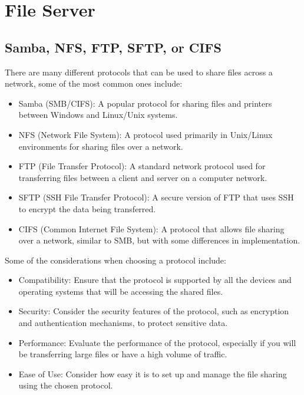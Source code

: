 \chapter{File Server}
\label{chp:fileserver}

\section{Samba, NFS, FTP, SFTP, or CIFS}
\label{sec:fileserver:protocols}
There are many different protocols that can be used to share files across a network, some of the most common ones include:

\begin{itemize}
    \item Samba (SMB/CIFS): A popular protocol for sharing files and printers between Windows and Linux/Unix systems.
    \item NFS (Network File System): A protocol used primarily in Unix/Linux environments for sharing files over a network.
    \item FTP (File Transfer Protocol): A standard network protocol used for transferring files between a client and server on a computer network.
    \item SFTP (SSH File Transfer Protocol): A secure version of FTP that uses SSH to encrypt the data being transferred.
    \item CIFS (Common Internet File System): A protocol that allows file sharing over a network, similar to SMB, but with some differences in implementation.
\end{itemize}

Some of the considerations when choosing a protocol include:

\begin{itemize}
    \item Compatibility: Ensure that the protocol is supported by all the devices and operating systems that will be accessing the shared files.
    \item Security: Consider the security features of the protocol, such as encryption and authentication mechanisms, to protect sensitive data.
    \item Performance: Evaluate the performance of the protocol, especially if you will be transferring large files or have a high volume of traffic.
    \item Ease of Use: Consider how easy it is to set up and manage the file sharing using the chosen protocol.
\end{itemize}

